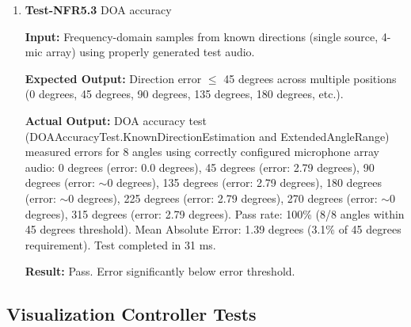 \documentclass[12pt, titlepage]{article}
\begin{document}
\begin{enumerate}
\textbf{Result:} Pass. Accuracy just meets the threshold.

\item{\textbf{Test-NFR5.3} DOA accuracy \\}

\textbf{Input:}
Frequency-domain samples from known directions (single source, 4-mic array)
using properly generated test audio.

\textbf{Expected Output:}
Direction error $\leq$ 45 degrees across multiple positions (0 degrees, 45
degrees, 90 degrees, 135 degrees, 180 degrees, etc.).

\textbf{Actual Output:}
DOA accuracy test \\(DOAAccuracyTest.KnownDirectionEstimation and
ExtendedAngleRange) measured errors for 8 angles using correctly configured
microphone array audio: 0 degrees (error: 0.0 degrees), 45 degrees (error: 2.79
degrees), 90 degrees (error: $\sim$0 degrees), 135 degrees (error: 2.79
degrees), 180 degrees (error: $\sim$0 degrees), 225 degrees (error: 2.79
degrees), 270 degrees (error: $\sim$0 degrees), 315 degrees (error: 2.79
degrees). Pass rate: 100\% (8/8 angles within 45 degrees threshold). Mean
Absolute Error: 1.39 degrees (3.1\% of 45 degrees requirement). Test completed
in 31 ms.

\textbf{Result:} Pass. Error significantly below error threshold.

\end{enumerate}

\subsection{Visualization Controller Tests} \label{sec:viz_nonfunc}
\end{document}
